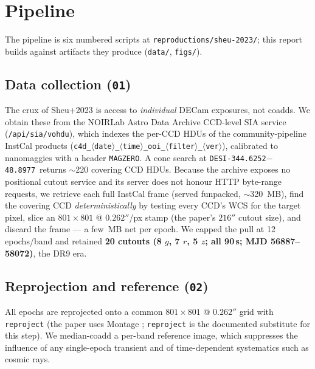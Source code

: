 \documentclass[11pt,letterpaper]{article}
\newcommand{\target}{\texttt{DESI-344.6252$-$48.8977}}
\begin{document}
\section{Pipeline}

The pipeline is six numbered scripts at \texttt{reproductions/sheu-2023/};
this report builds against artifacts they produce
(\texttt{data/}, \texttt{figs/}).

\subsection{Data collection (\texttt{01})}
The crux of Sheu+2023 is access to \emph{individual} DECam exposures, not
coadds. We obtain these from the NOIRLab Astro Data Archive CCD-level SIA
service (\texttt{/api/sia/vohdu}), which indexes the per-CCD HDUs of the
community-pipeline InstCal products
(\texttt{c4d\_$\langle$date$\rangle$\_$\langle$time$\rangle$\_ooi\_$\langle$filter$\rangle$\_$\langle$ver$\rangle$}),
calibrated to nanomaggies with a header \texttt{MAGZERO}. A cone search at
\target\ returns $\sim$220 covering CCD HDUs. Because the archive exposes no
positional cutout service and its server does not honour HTTP byte-range
requests, we retrieve each full InstCal frame (served funpacked,
$\sim$320~MB), find the covering CCD \emph{deterministically} by testing
every CCD's WCS for the target pixel, slice an $801\times801$ @ $0.262''$/px
stamp (the paper's $216''$ cutout size), and discard the frame --- a few~MB
net per epoch. We capped the pull at 12 epochs/band and retained
\textbf{20 cutouts (8 $g$, 7 $r$, 5 $z$; all 90\,s; MJD 56887--58072)}, the
DR9 era.

\subsection{Reprojection and reference (\texttt{02})}
All epochs are reprojected onto a common $801\times801$ @ $0.262''$ grid
with \texttt{reproject} \autocite{robitaille2020reproject} (the paper uses
Montage \autocite{jacob2010montage}; \texttt{reproject} is the documented
substitute for this step). We median-coadd a per-band reference image,
which suppresses the influence of any single-epoch transient and of
time-dependent systematics such as cosmic rays.
\end{document}
